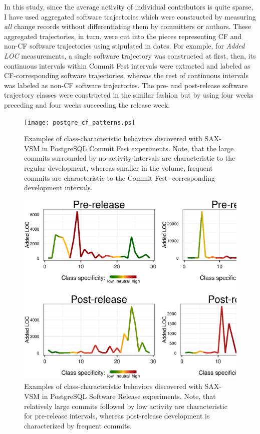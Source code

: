 In this study, since the average activity of individual contributors is quite sparse, I have used aggregated software trajectories which were constructed by measuring \textit{all} change records without differentiating them by committers or authors. These aggregated trajectories, in turn, were cut into the pieces representing CF and non-CF software trajectories using stipulated in \cite{commit-fest} dates. For example, for \textit{Added LOC} measurements, a single software trajectory was constructed at first, then, its continuous intervals within Commit Fest intervals were extracted and labeled as CF-corresponding software trajectories, whereas the rest of continuous intervals was labeled as non-CF software trajectories. The pre- and post-release software trajectory classes were constructed in the similar fashion but by using four weeks preceding and four weeks succeeding the release week.

\begin{figure}[t]
   \centering
   \texttt{[image: postgre\_cf\_patterns.ps]}
   \caption{Examples of class-characteristic behaviors discovered with SAX-VSM in PostgreSQL Commit Fest experiments. Note, that the large commits surrounded by no-activity intervals are characteristic to the regular development, whereas smaller in the volume, frequent commits are characteristic to the Commit Fest -corresponding development intervals. }
   \label{fig:postgre_cf_patterns}   
   \includegraphics[width=145mm]{figures/postgre_release_patterns.ps}
   \caption{Examples of class-characteristic behaviors discovered with SAX-VSM in PostgreSQL Software Release experiments. Note, that relatively large commits followed by low activity are characteristic for pre-release intervals, whereas post-release development is characterized by frequent commits.}
   \label{fig:postgre_release_patterns}
\end{figure}

